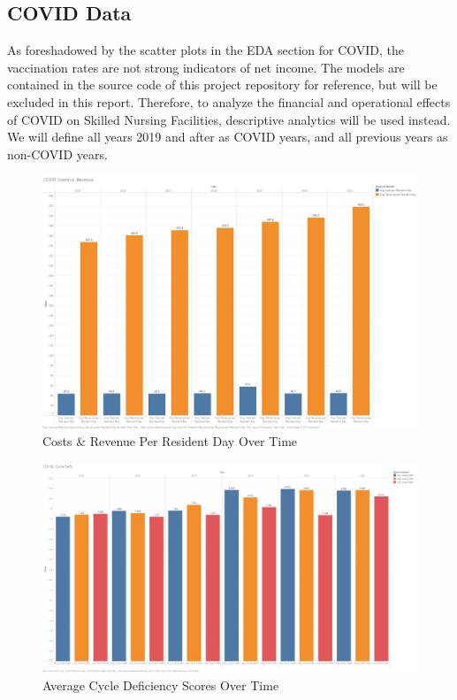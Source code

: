 \documentclass{article}
\theoremstyle{mytheoremstyle}
\theoremstyle{mytheoremstyle}
\theoremstyle{myproblemstyle}
\begin{document}
\pagebreak

\subsection{COVID Data}
As foreshadowed by the scatter plots in the EDA section for COVID, the vaccination rates are not strong indicators of net income. The models are contained in the source code of  this project repository for reference, but will be excluded in this report. Therefore, to analyze the financial and operational effects of COVID on Skilled Nursing Facilities, descriptive analytics will be used instead. We will define all years 2019 and after as COVID years, and all previous years as non-COVID years. 


\begin{figure}[htbp]
\centering
\includegraphics[width=\linewidth]{Images/COVID Costs vs. Revenue.png}
\caption{Costs \& Revenue Per Resident Day Over Time}
\label{fig:Robust Scaler Results}
\end{figure}
\pagebreak
\begin{figure}[htbp]
\centering
\includegraphics[width=\linewidth]{Images/COVID Cycle Defs.png}
\caption{Average Cycle Deficiency Scores Over Time}
\label{fig:Robust Scaler Results}
\end{figure}
\end{document}
